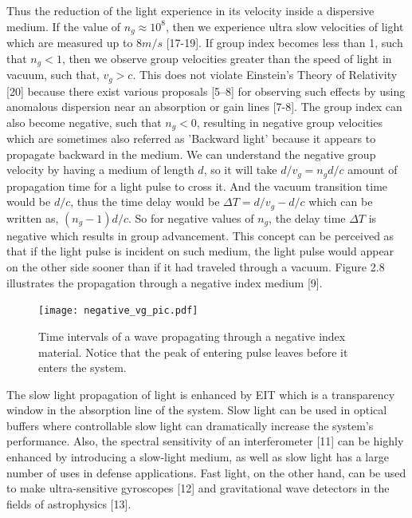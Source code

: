 Thus the reduction of the light experience in its velocity inside a dispersive medium. If the value of $n_{g} \approx 10^{8}$, then we experience ultra slow velocities of light which are measured up to $8m/s$ [17-19]. If group index becomes less than 1, such that $n_{g} < 1$, then we observe group velocities greater than the speed of light in vacuum, such that, $v_{g} > c$. This does not violate Einstein's Theory of Relativity [20] because there exist various proposals [5–8] for observing such effects by using anomalous dispersion near an absorption or gain lines [7-8]. The group index can also become negative, such that $n_{g} < 0$, resulting in negative group velocities which are sometimes also referred as 'Backward light' because it appears to propagate backward in the medium. We can understand the negative group velocity by having a medium of length $d$, so it will take $d/v_{g} = n_{g}d/c$ amount of propagation time for a light pulse to cross it. And the vacuum transition time would be $d/c$, thus the time delay would be $\Delta T = d/v_{g} - d/c$ which can be written as, $(n_{g}-1)d/c$. So for negative values of $n_{g}$, the delay time $\Delta T$ is negative which results in group advancement. This concept can be perceived as that if the light pulse is incident on such medium, the light pulse would appear on the other side sooner than if it had traveled through a vacuum. Figure 2.8 illustrates the propagation through a negative index medium [9]. 

\begin{figure}[h]
\centering
\texttt{[image: negative\_vg\_pic.pdf]}
\caption{Time intervals of a wave propagating through a negative index material. Notice that the peak of entering pulse leaves before it enters the system.}
\end{figure}

The slow light propagation of light is enhanced by EIT which is a transparency window in the absorption line of the system. Slow light can be used in optical buffers where controllable slow light can dramatically increase the system's performance. Also, the spectral sensitivity of an interferometer [11] can be highly enhanced by introducing a slow-light medium, as well as slow light has a large number of uses in defense applications. Fast light, on the other hand, can be used to make ultra-sensitive gyroscopes [12] and gravitational wave detectors in the fields of astrophysics [13].



